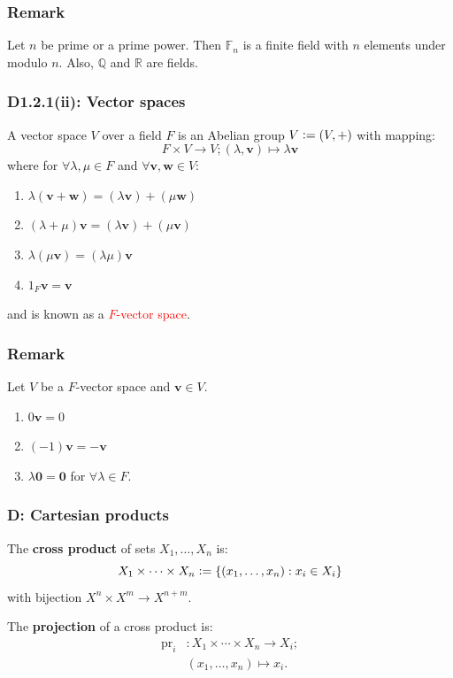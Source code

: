 \documentclass{article}
\newcommand{\deq}{\vcentcolon=}
\newcommand{\vc}[1]{\boldsymbol{#1}}
\begin{document}
\begin{multicols*}{3}
\subsubsection*{Remark}
Let $n$ be prime or a prime power.
Then $\mathbb{F}_n$ is a finite field with $n$ elements
under modulo $n$.
Also, $\mathbb{Q}$ and $\mathbb{R}$ are fields.

\subsubsection*{D1.2.1(ii): Vector spaces}
A vector space $V$ over a field $F$ is an Abelian group $V\deq(V,+)$
with mapping:
$$F\times V\rightarrow V;
(\lambda,\vc{v})\mapsto
\lambda\vc{v}$$
where for $\forall\lambda, \mu\in F$ and
$\forall\vc{v},\vc{w}\in V$:
\begin{enumerate}
    \item
    $\lambda(\vc{v}+\vc{w})
    =(\lambda\vc{v})+(\mu\vc{w})$

    \item $(\lambda+\mu)\vc{v}
    =(\lambda\vc{v})+(\mu\vc{v})$

    \item $\lambda(\mu\vc{v})=(\lambda\mu)\vc{v}$
    
    \item $1_F\vc{v}=\vc{v}$
\end{enumerate}
and is known as a \textcolor{red}{$F$-vector space}.

\subsubsection*{Remark}
Let $V$ be a $F$-vector space and $\vc{v}\in V$.
\begin{enumerate}
    \item $0\vc{v}=0$
    \item $(-1)\vc{v}=-\vc{v}$
    \item $\lambda\vc{0}=\vc{0}$
    for $\forall\lambda\in F$.
\end{enumerate}

\subsubsection*{D: Cartesian products}
The \textbf{cross product} of sets $X_1,\dots,X_n$ is:
$$X_1\times\cdots\times X_n
\deq\{(x_1,\dots,x_n):x_i\in X_i\}$$
with bijection $X^n\times X^m\rightarrow X^{n+m}$.

The \textbf{projection} of a cross product is:
\begin{align*}
    \text{pr}_i &:X_1\times\cdots\times X_n
    \rightarrow X_i; \\
    &(x_1,\dots,x_n)\mapsto x_i.
\end{align*}


\end{multicols*}
\end{document}

